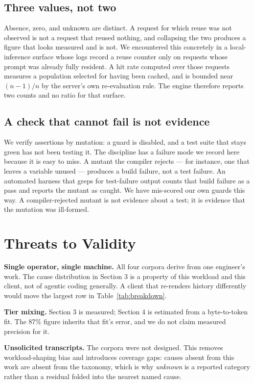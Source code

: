 \documentclass[11pt,twocolumn,letterpaper]{article}
\begin{document}
\subsection{Three values, not two}

Absence, zero, and unknown are distinct. A request for which reuse was not
observed is not a request that reused nothing, and collapsing the two produces a
figure that looks measured and is not. We encountered this concretely in a
local-inference surface whose logs record a reuse counter only on requests whose
prompt was already fully resident. A hit rate computed over those requests
measures a population selected for having been cached, and is bounded near
$(n-1)/n$ by the server's own re-evaluation rule. The engine therefore reports
two counts and no ratio for that surface.

\subsection{A check that cannot fail is not evidence}

We verify assertions by mutation: a guard is disabled, and a test suite that
stays green has not been testing it. The discipline has a failure mode we
record here because it is easy to miss. A mutant the compiler rejects --- for
instance, one that leaves a variable unused --- produces a build failure, not a
test failure. An automated harness that greps for test-failure output counts
that build failure as a pass and reports the mutant as caught. We have
mis-scored our own guards this way. A compiler-rejected mutant is not evidence
about a test; it is evidence that the mutation was ill-formed.

\section{Threats to Validity}

\textbf{Single operator, single machine.} All four corpora derive from one
engineer's work. The cause distribution in Section 3 is a property of this
workload and this client, not of agentic coding generally. A client that
re-renders history differently would move the largest row in
Table~\ref{tab:breakdown}.

\textbf{Tier mixing.} Section 3 is measured; Section 4 is estimated from a
byte-to-token fit. The 87\% figure inherits that fit's error, and we do not
claim measured precision for it.

\textbf{Unsolicited transcripts.} The corpora were not designed. This removes
workload-shaping bias and introduces coverage gaps: causes absent from this
work are absent from the taxonomy, which is why \emph{unknown} is a reported
category rather than a residual folded into the nearest named cause.
\end{document}
